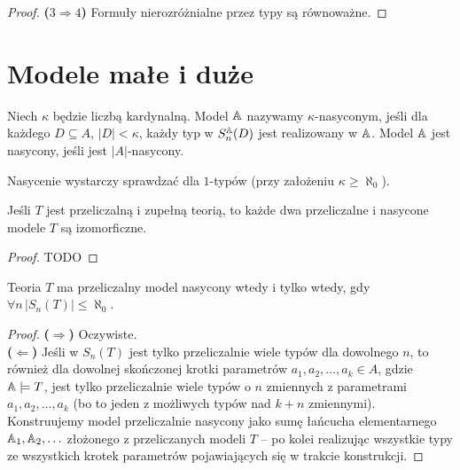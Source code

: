 \documentclass{article}
\begin{document}
\begin{proof}
	\textbf{($3 \Rightarrow 4$)}
	Formuły nierozróżnialne przez typy są równoważne.
\end{proof}


\section{Modele małe i duże}
\begin{df}
	 Niech $\kappa$ będzie liczbą kardynalną.
	 Model $\mathbb{A}$ nazywamy $\kappa$-nasyconym, jeśli dla każdego $D \subseteq A$, $|D| < \kappa$, każdy typ w $S^{\mathbb{A}}_n(D)$ jest realizowany w $\mathbb{A}$.
	Model $\mathbb{A}$ jest nasycony, jeśli jest $|A|$-nasycony.
\end{df}

\begin{uw}
	Nasycenie wystarczy sprawdzać dla $1$-typów (przy założeniu $\kappa \geq \aleph_0$).
\end{uw}

\begin{stw}
	 Jeśli $T$ jest przeliczalną i zupełną teorią, to każde dwa przeliczalne i nasycone modele $T$ są izomorficzne.
\end{stw}
\begin{proof}
	 TODO
\end{proof}
\begin{stw}
	Teoria $T$ ma przeliczalny model nasycony wtedy i tylko wtedy, gdy $\forall n \,|S_n(T)| \leq \aleph_0$.
\end{stw}
\begin{proof}
	 \textbf{($\Rightarrow$)} Oczywiste.
	 \\\textbf{($\Leftarrow$)} Jeśli w $S_n(T)$ jest tylko przeliczalnie wiele typów dla dowolnego $n$, to również dla dowolnej skończonej krotki parametrów $a_1, a_2, \ldots, a_k \in A$, gdzie $\mathbb{A} \models T$, jest tylko przeliczalnie wiele typów o $n$ zmiennych z parametrami $a_1, a_2, \ldots, a_k$ (bo to jeden z możliwych typów nad $k+n$ zmiennymi).
	 Konstruujemy model przeliczalnie nasycony jako sumę łańcucha elementarnego $\mathbb{A}_1, \mathbb{A}_2, \ldots$ złożonego z przeliczanych modeli $T$ -- po kolei realizując wszystkie typy ze wszystkich krotek parametrów pojawiających się w trakcie konstrukcji.

\end{proof}
\end{document}
